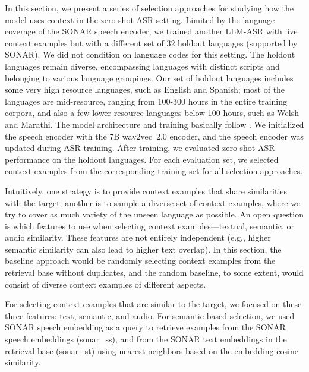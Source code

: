 \documentclass[]{fairmeta}
\begin{document}
In this section, we present a series of selection approaches for studying how the model uses context in the zero-shot ASR setting. Limited by the language coverage of the SONAR speech encoder, we trained another LLM-ASR with five context examples but with a different set of 32 holdout languages (supported by SONAR). We did not condition on language codes for this setting. The holdout languages remain diverse, encompassing languages with distinct scripts and belonging to various language groupings. Our set of holdout languages includes some very high resource languages, such as English and Spanish; most of the languages are mid-resource, ranging from 100-300 hours in the entire training corpora, and also a few lower resource languages below 100 hours, such as Welsh and Marathi. The model architecture and training basically follow . We initialized the speech encoder with the 7B wav2vec~2.0 encoder, and the speech encoder was updated during ASR training. After training, we evaluated zero-shot ASR performance on the holdout languages. For each evaluation set, we selected context examples from the corresponding training set for all selection approaches.

Intuitively, one strategy is to provide context examples that share similarities with the target; another is to sample a diverse set of context examples, where we try to cover as much variety of the unseen language as possible. An open question is which features to use when selecting context examples—textual, semantic, or audio similarity. These features are not entirely independent (e.g., higher semantic similarity can also lead to higher text overlap). In this section, the baseline approach would be randomly selecting context examples from the retrieval base without duplicates, and the random baseline, to some extent, would consist of diverse context examples of different aspects.

For selecting context examples that are similar to the target, we focused on these three features: text, semantic, and audio. For semantic-based selection, we used SONAR speech embedding as a query to retrieve examples from the SONAR speech embeddings (sonar\_ss), and from the SONAR text embeddings in the retrieval base (sonar\_st) using nearest neighbors based on the embedding cosine similarity.
 
\end{document}
